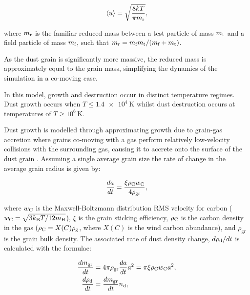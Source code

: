 \begin{equation}
  \langle u \rangle = \sqrt{\frac{8kT}{\pi m _\text{r}}} ,
\end{equation}

\noindent
where $m _\text{r}$ is the familiar reduced mass between a test particle of mass $m _\text{t}$ and a field particle of mass $m _\text{f}$, such that $m _\text{r} = m _\text{f} m _\text{t} / (m _\text{f} + m _\text{t})$.

\noindent
As the dust grain is significantly more massive, the reduced mass is approximately equal to the grain mass, simplifying the dynamics of the simulation in a co-moving case.

In this model, growth and destruction occur in distinct temperature regimes.
Dust growth occurs when $T \leq \SI{1.4e4}{\kelvin}$ whilst dust destruction occurs at temperatures of $T \geq 10^6 \, \si{\kelvin}$.

Dust growth is modelled through approximating growth due to grain-gas accretion where grains co-moving with a gas perform relatively low-velocity collisions with the surrounding gas, causing it to accrete onto the surface of the dust grain 
\parencite{spitzerPhysicalProcessesInterstellar2008}.
Assuming a single average grain size the rate of change in the average grain radius is given by:

\begin{equation}
  \label{eq:dadtch3}
  \frac{da}{dt} = \frac{\xi \rho_\text{C} w_\text{C}}{4 \rho_\text{gr}} ,
\end{equation}

\noindent
where $w_\text{C}$ is the Maxwell-Boltzmann distribution RMS velocity for carbon ($w_\text{C} = \sqrt{3 k_\text{B} T/12 m_\text{H}}$), $\xi$ is the grain sticking efficiency, $\rho_\text{C}$ is the carbon density in the gas ($\rho_\text{C} = X(C)\rho_\text{g}$, where $X(C)$ is the wind carbon abundance), and $\rho_\text{gr}$ is the grain bulk density.
The associated rate of dust density change, $d\rho_\text{d}/dt$ is calculated with the formulae:



\begin{subequations}
  \begin{align}
    \frac{dm_\text{gr}}{dt} & = 4\pi \rho_\text{gr} \frac{da}{dt} a^2 = \pi \xi \rho_\text{C} w_\text{C} a^2, \\
    \frac{d\rho_\text{d}}{dt} & = \frac{dm_\text{gr}}{dt} n_\text{d} ,
  \end{align}
\end{subequations}

